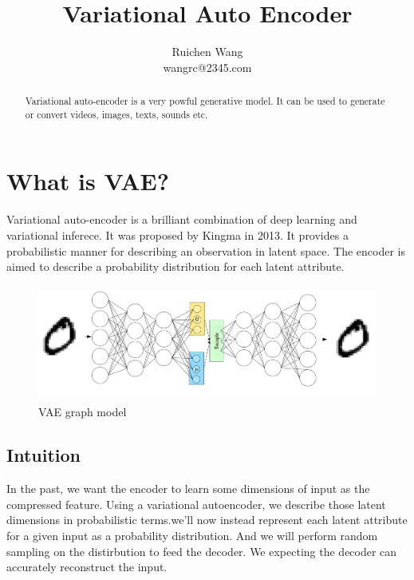 \documentclass{article}
\author{Ruichen Wang \\
wangrc@2345.com}
\title{Variational Auto Encoder}
\begin{document}
\maketitle
\begin{abstract}
Variational auto-encoder \cite{DBLP:journals/corr/KingmaW13} is a very powful generative model. It can be used to generate or convert videos, images, texts, sounds etc. 
\end{abstract}

\tableofcontents
\section{What is VAE?} 
Variational auto-encoder is a brilliant combination of deep learning and variational inferece. It was proposed by Kingma in 2013. It provides a probabilistic manner for describing an observation in latent space. The encoder is aimed to describe a probability distribution for each latent attribute.
\begin{figure}[h]
\centering
\includegraphics[width=5in,height=1.5in]{graph1}
\caption{VAE graph model}
\end{figure}
\subsection{Intuition}
In the past, we want the encoder to learn some  dimensions of input as the compressed feature. Using a variational autoencoder, we describe those latent dimensions in probabilistic terms.we'll now instead represent each latent attribute for a given input as a probability distribution. And we will perform random sampling on the distirbution to feed the decoder. We expecting the decoder can accurately reconstruct the input.
\end{document}
